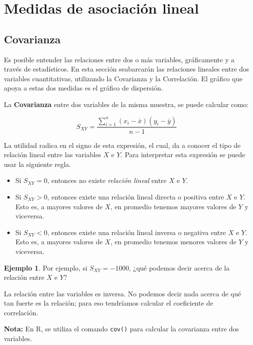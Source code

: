 \documentclass[
  11pt,
]{book}
\theoremstyle{definition}
\theoremstyle{definition}
\newtheorem{example}{Ejemplo}[chapter]
\theoremstyle{definition}
\theoremstyle{definition}
\theoremstyle{remark}
\begin{document}
\section{Medidas de asociación lineal}\label{medidas-de-asociaciuxf3n-lineal}

\subsection{Covarianza}\label{covarianza}

Es posible entender las relaciones entre dos o más variables, gráficamente y a través de estadísticos. En esta sección seabarcarán las relaciones lineales entre dos variables cuantitativas, utilizando la Covarianza y la Correlación. El gráfico que apoya a estas dos medidas es el gráfico de dispersión.

La \textbf{Covarianza} entre dos variables de la misma muestra, se puede calcular como:

\begin{equation}
S_{XY} = \displaystyle\frac{\displaystyle\sum_{i=1}^n(x_i-\bar{x})(y_i-\bar{y})}{n-1}
\label{eq:Covarianza}
\end{equation}

La utilidad radica en el signo de esta expresión, el cual, da a conocer el tipo de relación lineal entre las variables \(X\) e \(Y\). Para interpretar esta expresión se puede usar la siguiente regla.

\begin{itemize}
\item
  Si \(S_{XY} = 0\), entonces no existe \emph{relación lineal} entre \(X\) e \(Y\).
\item
  Si \(S_{XY} > 0\), entonces existe una relación lineal directa o positiva entre \(X\) e \(Y\). Esto es, a mayores valores de \(X\), en promedio tenemos mayores valores de \(Y\) y viceversa.
\item
  Si \(S_{XY} < 0\), entonces existe una relación lineal inversa o negativa entre \(X\) e \(Y\). Esto es, a mayores valores de \(X\), en promedio tenemos menores valores de \(Y\) y viceversa.
\end{itemize}

\begin{example}
Por ejemplo, si \(S_{XY} = -1000\), ¿qué podemos decir acerca de la relación entre \(X\) e \(Y\)?

La relación entre las variables es inversa. No podemos decir nada acerca de qué tan fuerte es la relación; para eso tendríamos calcular el coeficiente de correlación.

\textbf{Nota:} En R, se utiliza el comando \texttt{cov()} para calcular la covarianza entre dos variables.
\end{example}
\end{document}
